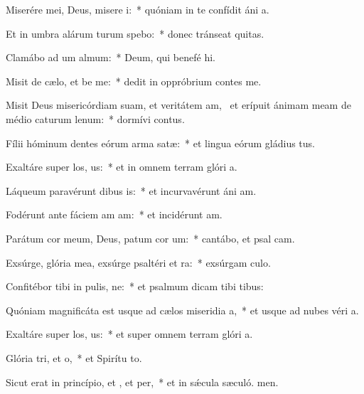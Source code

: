 \item Miserére mei, Deus, misere i:~* quóniam in te confídit áni a.
\item Et in umbra alárum turum spebo:~* donec tránseat quitas.
\item Clamábo ad um almum:~* Deum, qui benefé hi.
\item Misit de cælo, et be me:~* dedit in oppróbrium contes me.
\item Misit Deus misericórdiam suam, et veritátem am,~\pscross{} et erípuit ánimam meam de médio caturum lenum:~* dormívi contus.
\item Fílii hóminum dentes eórum arma  satæ:~* et lingua eórum gládius tus.
\item Exaltáre super los, us:~* et in omnem terram glóri a.
\item Láqueum paravérunt dibus is:~* et incurvavérunt áni am.
\item Fodérunt ante fáciem am am:~* et incidérunt  am.
\item Parátum cor meum, Deus, patum cor um:~* cantábo, et psal cam.
\item Exsúrge, glória mea, exsúrge psaltéri et ra:~* exsúrgam culo.
\item Confitébor tibi in pulis, ne:~* et psalmum dicam tibi  tibus:
\item Quóniam magnificáta est usque ad cælos miseridia a,~* et usque ad nubes véri a.
\item Exaltáre super los, us:~* et super omnem terram glóri a.
\item Glória tri, et o,~* et Spirítu to.
\item Sicut erat in princípio, et , et per,~* et in sǽcula sæculó. men.
